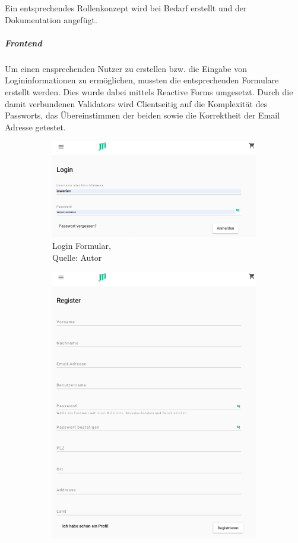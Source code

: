 Ein entsprechendes Rollenkonzept wird bei Bedarf erstellt und der Dokumentation angefügt. 

\subparagraph{Frontend}

Um einen ensprechenden Nutzer zu erstellen bzw. die Eingabe von Logininformationen zu ermöglichen, mussten die entsprechenden Formulare erstellt werden. Dies wurde dabei mittels Reactive Forms umgesetzt. Durch die damit verbundenen Validators wird Clientseitig auf die Komplexität des Passworts, das Übereinstimmen der beiden sowie die Korrektheit der Email Adresse getestet. 

\begin{figure}[H]
 	\begin{subfigure}[b]{0.4\textwidth}
 		\includegraphics[scale=0.4]{images/loginForm.PNG}
 		\caption[Login Formular]{Login Formular,\\ Quelle: Autor}
 		\label{img: loginForm}
 	\end{subfigure}
 	\hfill
 	\begin{subfigure}[b]{0.4\textwidth}
 		\includegraphics[scale=0.3]{images/registerForm.PNG}

\end{subfigure}
\end{figure}
